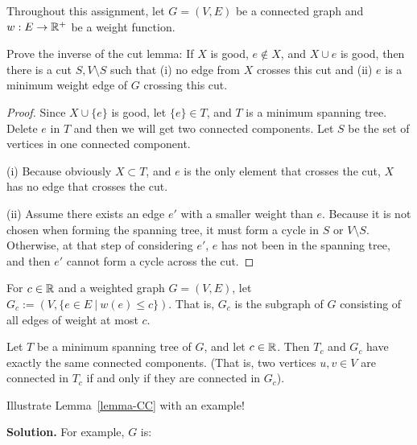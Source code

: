 


Throughout this assignment, let $G = (V,E)$ be a connected graph
and $w: E \rightarrow \mathbb{R}^+$ be a weight function.\\

\begin{exercise}
    Prove the inverse of the cut lemma:
      If $X$ is good, $e \not \in X$, and $X \cup e$ is good,
      then there is a cut $S, V\setminus S$ such that (i) no
      edge from $X$ crosses this cut and (ii) $e$ is a minimum
      weight edge of $G$ crossing this cut.
\end{exercise}
\begin{proof}
    Since $X \cup \{e\}$ is good, let $\{e\}\in T$, and $T$ is a minimum spanning tree. Delete $e$ in $T$ and then we will get two connected components. Let $S$ be the set of vertices in one connected component.

    (i) Because obviously $X\subset T$, and $e$ is the only element that crosses the cut, $X$ has no edge that crosses the cut.

    (ii) Assume there exists an edge $e'$ with a smaller weight than $e$. Because it is not chosen when forming the spanning tree, it must form a cycle in $S$ or $V\setminus S$. Otherwise, at that step of considering $e'$, $e$ has not been in the spanning tree, and then $e'$ cannot form a cycle across the cut.
\end{proof}

\begin{definition}
  For $c \in \mathbb{R}$ and a weighted graph $G = (V,E)$, let
  $G_c := (V, \{e \in E \ | \ w(e) \leq c\})$. That is, $G_c$ is the
  subgraph of $G$ consisting of all edges of weight at most $c$.
\end{definition}

\begin{lemma}
  Let $T$ be a minimum spanning tree of $G$, and let $c \in \mathbb{R}$.  Then
  $T_c$ and $G_c$ have exactly the same connected components.  (That
  is, two vertices $u,v \in V$ are connected in $T_c$ if and only if
  they are connected in $G_c$).
  \label{lemma-CC}
\end{lemma}

\begin{exercise}
     Illustrate Lemma~\ref{lemma-CC} with an example!
\end{exercise}

\textbf{Solution.}
For example, $G$ is:


